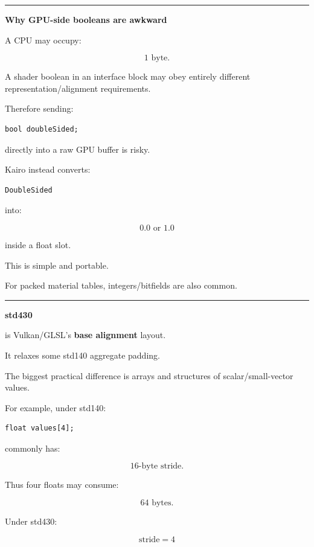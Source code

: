 \begin{center}\rule{0.5\linewidth}{0.5pt}\end{center}

\textbf{Why GPU-side booleans are awkward}

A CPU  may occupy:

\[
1\text{ byte}.
\]

A shader boolean in an interface block may obey entirely different representation/alignment requirements.

Therefore sending:

\begin{verbatim}
bool doubleSided;
\end{verbatim}

directly into a raw GPU buffer is risky.

Kairo instead converts:

\begin{verbatim}
DoubleSided
\end{verbatim}

into:

\[
0.0\text{ or }1.0
\]

inside a float slot.

This is simple and portable.

For packed material tables, integers/bitfields are also common.

\begin{center}\rule{0.5\linewidth}{0.5pt}\end{center}

\textbf{std430}

 is Vulkan/GLSL's \textbf{base alignment} layout.

It relaxes some std140 aggregate padding.

The biggest practical difference is arrays and structures of scalar/small-vector values.

For example, under std140:

\begin{verbatim}
float values[4];
\end{verbatim}

commonly has:

\[
16\text{-byte stride}.
\]

Thus four floats may consume:

\[
64\text{ bytes}.
\]

Under std430:

\[
\text{stride}=4
\]


